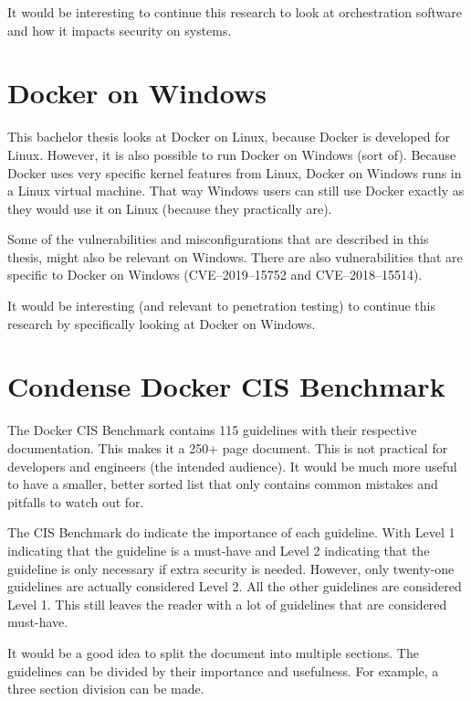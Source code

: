 It would be interesting to continue this research to look at orchestration software and how it impacts security on systems.

\section{Docker on Windows}
This bachelor thesis looks at Docker on Linux, because Docker is developed for Linux. However, it is also possible to run Docker on Windows (sort of). Because Docker uses very specific kernel features from Linux, Docker on Windows runs in a Linux virtual machine. That way Windows users can still use Docker exactly as they would use it on Linux (because they practically are).

\hfill

Some of the vulnerabilities and misconfigurations that are described in this thesis, might also be relevant on Windows. There are also vulnerabilities that are specific to Docker on Windows (CVE--2019--15752 and CVE--2018--15514).

\hfill

It would be interesting (and relevant to penetration testing) to continue this research by specifically looking at Docker on Windows.

\section{Condense Docker CIS Benchmark}

The Docker CIS Benchmark contains 115 guidelines with their respective documentation.
This makes it a 250+ page document. This is not practical for developers and engineers (the intended audience). It would be much more useful to have a smaller, better sorted list that only contains common mistakes and pitfalls to watch out for.

\hfill

The CIS Benchmark do indicate the importance of each guideline.
With Level 1 indicating that the guideline is a must-have and Level 2 indicating that the guideline is only necessary if extra security is needed. However, only twenty-one guidelines are actually considered Level 2. All the other guidelines are considered Level 1. This still leaves the reader with a lot of guidelines that are considered must-have.

\hfill

It would be a good idea to split the document into multiple sections. The guidelines can be divided by their importance and usefulness. For example, a three section division can be made.

